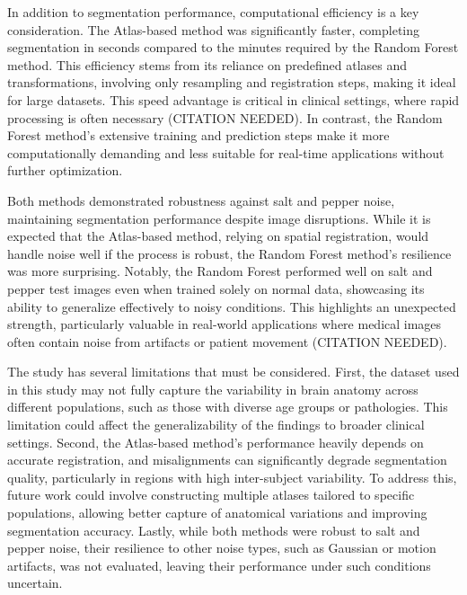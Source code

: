 In addition to segmentation performance, computational efficiency is a key consideration. The Atlas-based method was significantly faster, completing segmentation in seconds compared to the minutes required by the Random Forest method. This efficiency stems from its reliance on predefined atlases and transformations, involving only resampling and registration steps, making it ideal for large datasets. This speed advantage is critical in clinical settings, where rapid processing is often necessary (CITATION NEEDED). In contrast, the Random Forest method’s extensive training and prediction steps make it more computationally demanding and less suitable for real-time applications without further optimization.


Both methods demonstrated robustness against salt and pepper noise, maintaining segmentation performance despite image disruptions. While it is expected that the Atlas-based method, relying on spatial registration, would handle noise well if the process is robust, the Random Forest method's resilience was more surprising. Notably, the Random Forest performed well on salt and pepper test images even when trained solely on normal data, showcasing its ability to generalize effectively to noisy conditions. This highlights an unexpected strength, particularly valuable in real-world applications where medical images often contain noise from artifacts or patient movement (CITATION NEEDED).

The study has several limitations that must be considered. First, the dataset used in this study may not fully capture the variability in brain anatomy across different populations, such as those with diverse age groups or pathologies. This limitation could affect the generalizability of the findings to broader clinical settings. Second, the Atlas-based method’s performance heavily depends on accurate registration, and misalignments can significantly degrade segmentation quality, particularly in regions with high inter-subject variability. To address this, future work could involve constructing multiple atlases tailored to specific populations, allowing better capture of anatomical variations and improving segmentation accuracy. Lastly, while both methods were robust to salt and pepper noise, their resilience to other noise types, such as Gaussian or motion artifacts, was not evaluated, leaving their performance under such conditions uncertain.